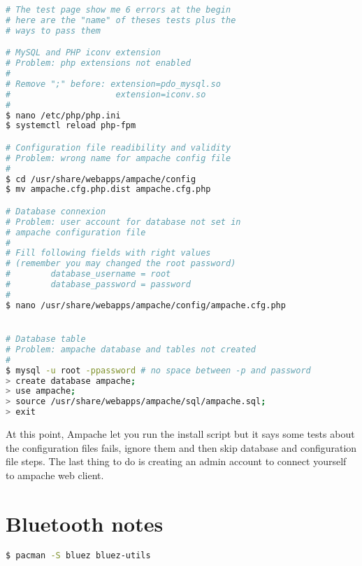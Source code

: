 \begin{lstlisting}[language=bash,caption=Ampache setup]
# The test page show me 6 errors at the begin
# here are the "name" of theses tests plus the 
# ways to pass them

# MySQL and PHP iconv extension
# Problem: php extensions not enabled
#
# Remove ";" before: extension=pdo_mysql.so
#                     extension=iconv.so
#
$ nano /etc/php/php.ini
$ systemctl reload php-fpm

# Configuration file readibility and validity
# Problem: wrong name for ampache config file
#
$ cd /usr/share/webapps/ampache/config
$ mv ampache.cfg.php.dist ampache.cfg.php

# Database connexion
# Problem: user account for database not set in 
# ampache configuration file
#
# Fill following fields with right values
# (remember you may changed the root password)
#        database_username = root
#        database_password = password
#
$ nano /usr/share/webapps/ampache/config/ampache.cfg.php


# Database table
# Problem: ampache database and tables not created
#
$ mysql -u root -ppassword # no space between -p and password
> create database ampache;
> use ampache;
> source /usr/share/webapps/ampache/sql/ampache.sql;
> exit
\end{lstlisting}

At this point, Ampache let you run the install script but it says some tests about 
the configuration files fails, ignore them and then skip database and configuration 
file steps. The last thing to do is creating an admin account to connect yourself 
to ampache web client.

\section{Bluetooth notes}
\begin{lstlisting}[language=bash,caption=Bluetooth]
$ pacman -S bluez bluez-utils
\end{lstlisting}
%
